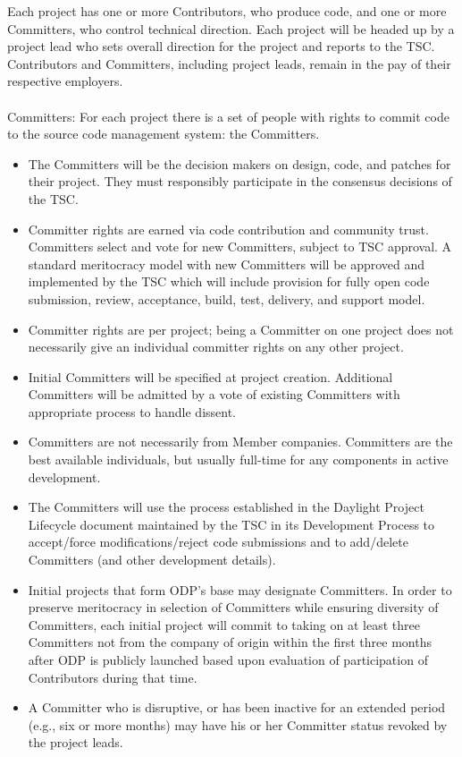 \documentclass[a4paper, 12pt]{book}
\begin{document}
Each project has one or more Contributors, who produce code, and one or more Committers, who control technical direction.  Each project will be headed up by a project lead who sets overall direction for the project and reports to the TSC.  Contributors and Committers, including project leads, remain in the pay of their respective employers.\\
\\
Committers: For each project there is a set of people with rights to commit code to the source code management system: the Committers.
\begin{itemize}\itemsep0pt
\item{The Committers will be the decision makers on design, code, and patches for their project. They must responsibly participate in the consensus decisions of the TSC.}
\item{Committer rights are earned via code contribution and community trust.   Committers select and vote for new Committers, subject to TSC approval.  A standard meritocracy model with new Committers will be approved and implemented by the TSC which will include provision for fully open code submission, review, acceptance, build, test, delivery, and support model.}
\item{Committer rights are per project; being a Committer on one project does not necessarily give an individual committer rights on any other project.}
\item{Initial Committers will be specified at project creation.  Additional Committers will be admitted by a vote of existing Committers with appropriate process to handle dissent.}
\item{Committers are not necessarily from Member companies.  Committers are the best available individuals, but usually full-time for any components in active development.}
\item{The Committers will use the process established in the Daylight Project Lifecycle document maintained by the TSC in its Development Process to accept/force modifications/reject code submissions and to add/delete Committers (and other development details).}
\item{Initial projects that form ODP’s base may designate Committers.  In order to preserve meritocracy in selection of Committers while ensuring diversity of Committers, each initial project will commit to taking on at least three Committers not from the company of origin within the first three months after ODP is publicly launched based upon evaluation of participation of Contributors during that time.}
\item{A Committer who is disruptive, or has been inactive for an extended period (e.g., six or more months) may have his or her Committer status revoked by the project leads.}
\end{itemize}
\end{document}
